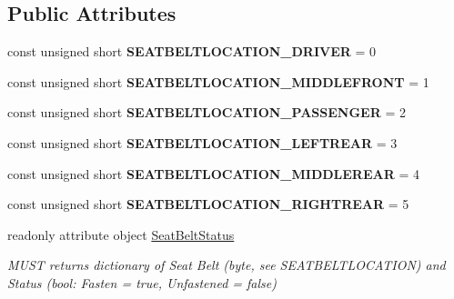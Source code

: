 \subsection*{Public Attributes}
\begin{DoxyCompactItemize}
\item 
\hypertarget{interfaceVehicle_1_1SeatBeltStatus_a2f516e9a68d97628c81d7bc2ba37574d}{const unsigned short {\bfseries S\-E\-A\-T\-B\-E\-L\-T\-L\-O\-C\-A\-T\-I\-O\-N\-\_\-\-D\-R\-I\-V\-E\-R} = 0}\label{interfaceVehicle_1_1SeatBeltStatus_a2f516e9a68d97628c81d7bc2ba37574d}

\item 
\hypertarget{interfaceVehicle_1_1SeatBeltStatus_acd535ffbae12b714814561f87fecef98}{const unsigned short {\bfseries S\-E\-A\-T\-B\-E\-L\-T\-L\-O\-C\-A\-T\-I\-O\-N\-\_\-\-M\-I\-D\-D\-L\-E\-F\-R\-O\-N\-T} = 1}\label{interfaceVehicle_1_1SeatBeltStatus_acd535ffbae12b714814561f87fecef98}

\item 
\hypertarget{interfaceVehicle_1_1SeatBeltStatus_adc554f780b2ac34551215953f3efa86a}{const unsigned short {\bfseries S\-E\-A\-T\-B\-E\-L\-T\-L\-O\-C\-A\-T\-I\-O\-N\-\_\-\-P\-A\-S\-S\-E\-N\-G\-E\-R} = 2}\label{interfaceVehicle_1_1SeatBeltStatus_adc554f780b2ac34551215953f3efa86a}

\item 
\hypertarget{interfaceVehicle_1_1SeatBeltStatus_a7362a95acb6d4c68219f775f504b80dd}{const unsigned short {\bfseries S\-E\-A\-T\-B\-E\-L\-T\-L\-O\-C\-A\-T\-I\-O\-N\-\_\-\-L\-E\-F\-T\-R\-E\-A\-R} = 3}\label{interfaceVehicle_1_1SeatBeltStatus_a7362a95acb6d4c68219f775f504b80dd}

\item 
\hypertarget{interfaceVehicle_1_1SeatBeltStatus_a60f19df5a1c24e69015e8eb18799dde5}{const unsigned short {\bfseries S\-E\-A\-T\-B\-E\-L\-T\-L\-O\-C\-A\-T\-I\-O\-N\-\_\-\-M\-I\-D\-D\-L\-E\-R\-E\-A\-R} = 4}\label{interfaceVehicle_1_1SeatBeltStatus_a60f19df5a1c24e69015e8eb18799dde5}

\item 
\hypertarget{interfaceVehicle_1_1SeatBeltStatus_aad83df60ae65f788133575fb18c9e7a6}{const unsigned short {\bfseries S\-E\-A\-T\-B\-E\-L\-T\-L\-O\-C\-A\-T\-I\-O\-N\-\_\-\-R\-I\-G\-H\-T\-R\-E\-A\-R} = 5}\label{interfaceVehicle_1_1SeatBeltStatus_aad83df60ae65f788133575fb18c9e7a6}

\item 
readonly attribute object \hyperlink{interfaceVehicle_1_1SeatBeltStatus_a88d4017d671010ab66ca424a5e4977f2}{Seat\-Belt\-Status}
\begin{DoxyCompactList}\small\item\em M\-U\-S\-T returns dictionary of Seat Belt (byte, see S\-E\-A\-T\-B\-E\-L\-T\-L\-O\-C\-A\-T\-I\-O\-N) and Status (bool\-: Fasten = true, Unfastened = false) \end{DoxyCompactList}\end{DoxyCompactItemize}
